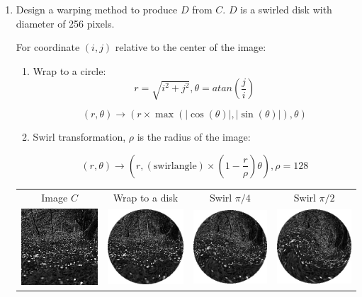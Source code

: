 \documentclass[12pt,a4paper,notitlepage,oneside,amsmath,amssymb]{article}
\begin{document}
\begin{CJK*}{UTF8}{bkai}
\begin{enumerate}[label=(\alph*)]
		\item Design a warping method to produce \(D\) from \(C\). \(D\) is a swirled disk with diameter of 256 pixels.

    For coordinate \((i,j)\) relative to the center of the image:
    \begin{enumerate}
      \item Wrap to a circle:
      \[r = \sqrt{i^2 + j^2}, \theta = atan (\frac{j}{i})\]

      \[(r,\theta ) \rightarrow (r \times \max (|\cos(\theta)|, |\sin(\theta)|), \theta)\]

      \item Swirl transformation, \(\rho\) is the radius of the image:

      \[(r,\theta ) \rightarrow (r , (\mathrm{swirl angle}) \times (1-\frac{r}{\rho}) \theta), \rho = 128\]
    \end{enumerate}

		      \begin{tabular}[h!]{cccc}
			      Image \(C\)                                           & Wrap to a disk & Swirl \( \pi/4 \) & Swirl \( \pi/2 \) \\
			      \includegraphics[width=.23\linewidth]{image_C}        &
			      \includegraphics[width=.23\linewidth]{image_D_round}  &
			      \includegraphics[width=.23\linewidth]{image_D_0_25PI} &
			      \includegraphics[width=.23\linewidth]{image_D_0_5PI}                                                           \\
		      \end{tabular}

	\end{enumerate}

	\clearpage

\end{CJK*}
\end{document}
